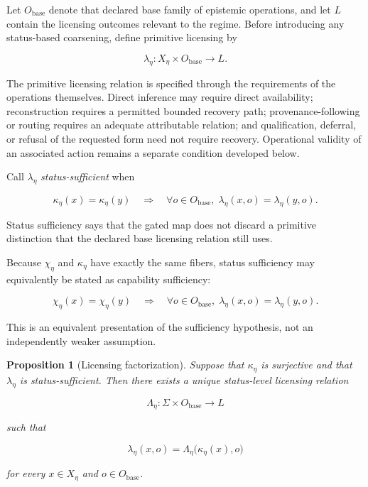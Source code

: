 \documentclass[11pt]{article}
\newtheorem{proposition}{Proposition}[section]
\theoremstyle{definition}
\theoremstyle{remark}
\begin{document}
Let \(O_{\mathrm{base}}\) denote that declared base family of epistemic operations, and let \(L\) contain the licensing outcomes relevant to the regime. Before introducing any status-based coarsening, define primitive licensing by

\[
\lambda_{\eta}:
X_{\eta}\times O_{\mathrm{base}}
\rightarrow L.
\]

The primitive licensing relation is specified through the requirements of the operations themselves. Direct inference may require direct availability; reconstruction requires a permitted bounded recovery path; provenance-following or routing requires an adequate attributable relation; and qualification, deferral, or refusal of the requested form need not require recovery. Operational validity of an associated action remains a separate condition developed below.

Call \(\lambda_{\eta}\) \emph{status-sufficient} when

\[
\kappa_{\eta}(x)=\kappa_{\eta}(y)
\quad\Longrightarrow\quad
\forall o\in O_{\mathrm{base}},
\;
\lambda_{\eta}(x,o)=\lambda_{\eta}(y,o).
\]

Status sufficiency says that the gated map does not discard a primitive distinction that the declared base licensing relation still uses.

Because \(\chi_{\eta}\) and \(\kappa_{\eta}\) have exactly the same fibers, status sufficiency may equivalently be stated as capability sufficiency:

\[
\chi_{\eta}(x)=\chi_{\eta}(y)\quad\Longrightarrow\quad\forall o\in O_{\mathrm{base}},\;\lambda_{\eta}(x,o)=\lambda_{\eta}(y,o).
\]

This is an equivalent presentation of the sufficiency hypothesis, not an independently weaker assumption.

\begin{proposition}[Licensing factorization]
\label{prop:licensing-factorization}
Suppose that \(\kappa_{\eta}\) is surjective and that \(\lambda_{\eta}\) is status-sufficient. Then there exists a unique status-level licensing relation

\[
\Lambda_{\eta}:
\Sigma\times O_{\mathrm{base}}
\rightarrow L
\]

such that

\[
\lambda_{\eta}(x,o)
=
\Lambda_{\eta}
\bigl(
\kappa_{\eta}(x),o
\bigr)
\]

for every \(x\in X_{\eta}\) and
\(o\in O_{\mathrm{base}}\).
\end{proposition}
\end{document}
